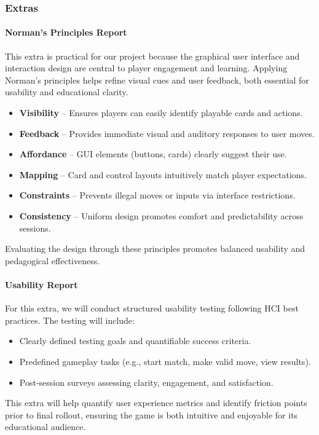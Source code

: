\documentclass[12pt, titlepage]{article}
\begin{document}
\subsubsection{Extras}
\paragraph{Norman’s Principles Report}
This extra is practical for our project because the graphical user interface and interaction design are central to player engagement and learning. Applying Norman’s principles helps refine visual cues and user feedback, both essential for usability and educational clarity.  
\begin{itemize}
    \item \textbf{Visibility} – Ensures players can easily identify playable cards and actions.  
    \item \textbf{Feedback} – Provides immediate visual and auditory responses to user moves.  
    \item \textbf{Affordance} – GUI elements (buttons, cards) clearly suggest their use.  
    \item \textbf{Mapping} – Card and control layouts intuitively match player expectations.  
    \item \textbf{Constraints} – Prevents illegal moves or inputs via interface restrictions.  
    \item \textbf{Consistency} – Uniform design promotes comfort and predictability across sessions.  
\end{itemize}
Evaluating the design through these principles promotes balanced usability and pedagogical effectiveness.

\paragraph{Usability Report}
For this extra, we will conduct structured usability testing following HCI best practices. The testing will include:
\begin{itemize}
    \item Clearly defined testing goals and quantifiable success criteria.  
    \item Predefined gameplay tasks (e.g., start match, make valid move, view results).  
    \item Post-session surveys assessing clarity, engagement, and satisfaction.  
\end{itemize}
This extra will help quantify user experience metrics and identify friction points prior to final rollout, ensuring the game is both intuitive and enjoyable for its educational audience.
\end{document}
